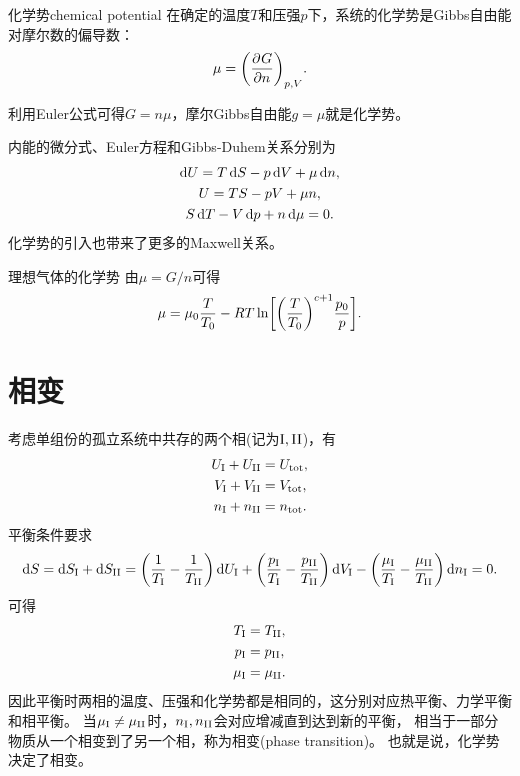 \begin{definition}
	{化学势}{chemical potential}
	在确定的温度$T$和压强$p$下，系统的化学势是Gibbs自由能对摩尔数的偏导数：
	\begin{equation}
		\mu=\pu[p,V]Gn.
	\end{equation}
\end{definition}

\begin{corollary}
	利用Euler公式可得$G=n\mu$，摩尔Gibbs自由能$g=\mu$就是化学势。
\end{corollary}

\begin{corollary}
	内能的微分式、Euler方程和Gibbs-Duhem关系分别为
	\begin{subequations}
		\begin{gather}
			\d U=T\d S-p\d V+\mu\d n,\\
			U=TS-pV+\mu n,\\
			S\d T-V\d p+n\d\mu=0.
		\end{gather}
	\end{subequations}
	化学势的引入也带来了更多的Maxwell关系。
\end{corollary}

\begin{example}
	{理想气体的化学势}{}
	由$\mu=G/n$可得
	\begin{equation}
		\mu=\mu_0\frac T{T_0}-RT\ln\biggfkh{\biggkh{\frac T{T_0}}^{c+1}\frac{p_0}p}.
	\end{equation}
\end{example}

\section{相变}
\label{sec:phase transition}

考虑单组份的孤立系统中共存的两个相(记为$\phI,\phII$)，有
\begin{align*}
	U_\phI+U_\phII&=U\tot,\\
	V_\phI+V_\phII&=V\tot,\\
	n_\phI+n_\phII&=n\tot.
\end{align*}
平衡条件要求
\[
	\d S=\d S_\phI+\d S_\phII
	=\biggkh{\frac1{T_\phI}-\frac1{T_\phII}}\d U_\phI
	+\biggkh{\frac{p_\phI}{T_\phI}-\frac{p_\phII}{T_\phII}}\d V_\phI
	-\biggkh{\frac{\mu_\phI}{T_\phI}-\frac{\mu_\phII}{T_\phII}}\d n_\phI
	=0.
\]
可得
\begin{subequations}
	\begin{align}
		T_\phI&=T_\phII,\\
		p_\phI&=p_\phII,\\
		\mu_\phI&=\mu_\phII.
	\end{align}
\end{subequations}
因此平衡时两相的温度、压强和化学势都是相同的，这分别对应热平衡、力学平衡和相平衡。
当$\mu_\phI\neq\mu_\phII$时，$n_\phI,n_\phII$会对应增减直到达到新的平衡，
相当于一部分物质从一个相变到了另一个相，称为相变(phase transition)。
也就是说，化学势决定了相变。

